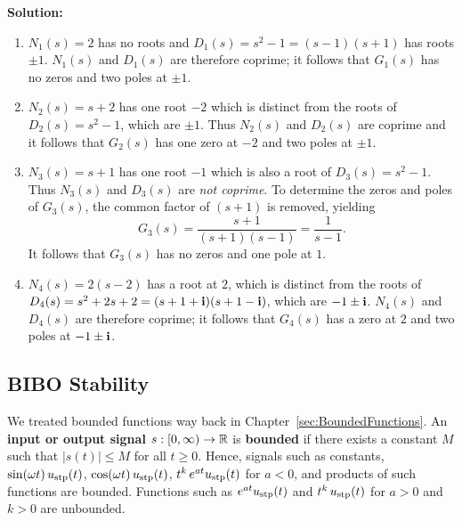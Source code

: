 \textbf{Solution:}
\begin{enumerate}
\renewcommand{\labelenumi}{(\alph{enumi})}
\setlength{\itemsep}{.2cm}

\item $N_1(s) = 2$ has no roots and $D_1(s) = s^2-1 = (s-1)(s+1)$ has roots $\pm 1$. $N_1(s)$ and $D_1(s)$ are therefore coprime; it follows that $G_1(s)$ has no zeros and two poles at $\pm1$.\\

\item $N_2(s)=s+2$ has one root $-2$ which is distinct from the roots of $D_2(s) = s^2-1$, which are $\pm 1$. Thus $N_2(s)$ and $D_2(s)$ are coprime and it follows that $G_2(s)$ has one zero at $-2$ and two poles at $\pm1$.\\

\item $N_3(s)=s+1$ has one root $-1$ which is also a root of $D_3(s)=s^2-1$. Thus $N_3(s)$ and $D_3(s)$ are \emph{not coprime}. To determine the zeros and poles of $G_3(s)$, the common factor of $(s+1)$ is removed, yielding
 $$G_3(s) = \frac{s+1}{(s+1)(s-1)} = \frac{1}{s-1}. $$
 It follows that $G_3(s)$ has no zeros and one pole at $1$.\\

\item  $N_4(s)=2(s-2)$ has a root at $2$, which is distinct from the roots of $D_4(s) = s^2 + 2s + 2 = (s+1+\mathop{\bm{\mathrm i}})(s+1-\mathop{\bm{\mathrm i}})$, which are $-1\pm \mathop{\bm{\mathrm i}}$. $N_4(s)$ and $D_4(s)$ are therefore coprime; it follows that $G_4(s)$ has a zero at $2$ and two poles at $-1\pm \mathop{\bm{\mathrm i}}$.

\end{enumerate}

\subsection{BIBO Stability}

We treated bounded functions way back in Chapter~\ref{sec:BoundedFunctions}. An \textbf{input or output signal} $s:[0, \infty) \to \mathbb R$ is \textbf{bounded} if there exists a constant $M$ such that $|s(t)|\le M$ for all $t\ge 0$. Hence, signals such as constants, $\sin(\omega t) \, u_{\rm stp}(t)$, $\cos(\omega t) \, u_{\rm stp}(t)$, $t^k \, e^{at} u_{\rm stp}(t)$ for $a<0$, and products of such functions are bounded. Functions such as $e^{at} u_{\rm stp}(t)$ and $t^k \, u_{\rm stp}(t)$ for $a>0$ and $k>0$ are unbounded. 

